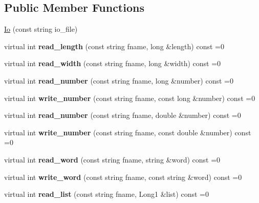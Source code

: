 \subsection*{Public Member Functions}
\begin{DoxyCompactItemize}
\item 
\mbox{\hyperlink{structIo_a5d9ad9b1887a715c69a8dce3e967f8d2}{Io}} (const string io\+\_\+file)
\item 
\mbox{\label{structIo_a84c3a5705ee9fa5bd587ca62e1a264cb}} 
virtual int {\bfseries read\+\_\+length} (const string fname, long \&length) const =0
\item 
\mbox{\label{structIo_a83c506d5d17ea5cc29a2112230c2836d}} 
virtual int {\bfseries read\+\_\+width} (const string fname, long \&width) const =0
\item 
\mbox{\label{structIo_aaf24fb114744f57fb2339496f943ce93}} 
virtual int {\bfseries read\+\_\+number} (const string fname, long \&number) const =0
\item 
\mbox{\label{structIo_a163d88ee778a65ecafd62bcb35d9fc33}} 
virtual int {\bfseries write\+\_\+number} (const string fname, const long \&number) const =0
\item 
\mbox{\label{structIo_afa392b6b1b220976bcfc473540bbba40}} 
virtual int {\bfseries read\+\_\+number} (const string fname, double \&number) const =0
\item 
\mbox{\label{structIo_ab68527fc3909f395e07564f0f726eeb7}} 
virtual int {\bfseries write\+\_\+number} (const string fname, const double \&number) const =0
\item 
\mbox{\label{structIo_ad5a50f54b41f5076b0b4fcc03ac0f270}} 
virtual int {\bfseries read\+\_\+word} (const string fname, string \&word) const =0
\item 
\mbox{\label{structIo_a60ce58b270dd4beeb0263bfdd2c63daf}} 
virtual int {\bfseries write\+\_\+word} (const string fname, const string \&word) const =0
\item 
\mbox{\label{structIo_ad8db00e516c6686e4844c7ad6bfbd28e}} 
virtual int {\bfseries read\+\_\+list} (const string fname, Long1 \&list) const =0

\end{DoxyCompactItemize}
